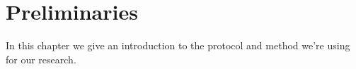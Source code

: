 \chapter{Preliminaries}\label{preliminaries}

In this chapter we give an introduction to the protocol and method we're using for our research.




